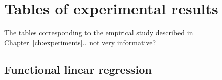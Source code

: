 %
%

\chapter{Tables of experimental results}\label{ch:tables}

The tables corresponding to the empirical study described in Chapter~\ref{ch:experiments}.. not very informative?

\section*{Functional linear regression}

